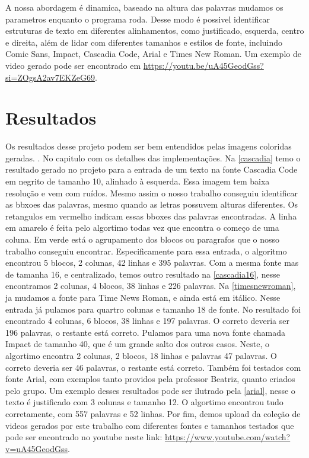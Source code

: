 \documentclass[english, 
               brazil, 
               bsc] %
               {dcomp-abntex2}
\begin{document}
A nossa abordagem é dinamica, baseado na altura das palavras mudamos os parametros enquanto o programa roda. Desse modo é possivel identificar estruturas de texto em diferentes alinhamentos, como justificado, esquerda, centro e direita, além de lidar com diferentes tamanhos e estilos de fonte, incluindo Comic Sans, Impact, Cascadia Code, Arial e Times New Roman. Um exemplo de video gerado pode ser encontrado em \url{https://youtu.be/uA45GeodGss?si=ZOgsA2av7EKZeG69}.

\section{Resultados}

Os resultados desse projeto podem ser bem entendidos pelas imagens coloridas geradas. . No capitulo com os detalhes das implementações. Na \autoref{cascadia} temo o resultado gerado no projeto para a entrada de um texto na fonte Cascadia Code em negrito de tamanho 10, alinhado à esquerda. Essa imagem tem baixa resolução e vem com ruídos. Mesmo assim o nosso trabalho conseguiu identificar as bbxoes das palavras, mesmo quando as letras possuvem alturas diferentes. Os retangulos em vermelho indicam essas bboxes das palavras encontradas. A linha em amarelo é feita pelo algortimo todas vez que encontra o começo de  uma coluna. Em verde está o agrupamento dos blocos ou paragrafos que o nosso trabalho conseguiu encontrar. Especificamente para essa entrada, o algoritmo encontrou 5 blocos, 2 colunas, 42 linhas e 395 palavras. Com a mesma fonte mas de tamanha 16, e centralizado, temos outro resultado na \autoref{cascadia16}, nesse encontramos 2 colunas, 4 blocos, 38 linhas e 226 palavras. Na \autoref{timesnewroman}, ja mudamos a fonte para Time News Roman, e ainda está em itálico. Nesse entrada já pulamos para quartro colunas e tamanho 18 de fonte. No resultado foi encontrado 4 colunas, 6 blocos, 38 linhas e 197 palavras. O correto deveria ser 196 palavras, o restante está correto. Pulamos para uma nova fonte chamada Impact de tamanho 40, que é um grande salto dos outros casos. Neste, o algortimo encontra 2 colunas, 2 blocos, 18 linhas e palavras 47 palavras. O correto deveria ser 46 palavras, o restante está correto. Também foi testados com fonte Arial, com exemplos tanto providos pela professor Beatriz, quanto criados pelo grupo. Um exemplo desses resultados pode ser ilutrado pela \autoref{arial}, nesse o texto é justificado com 3 colunas e tamanho 12. O algortimo encontrou tudo corretamente, com 557 palavras e 52 linhas. Por fim, demos upload da coleção de videos gerados por este trabalho com  diferentes fontes e tamanhos testados que pode ser encontrado no youtube neste link: \url{https://www.youtube.com/watch?v=uA45GeodGss}.
\end{document}
